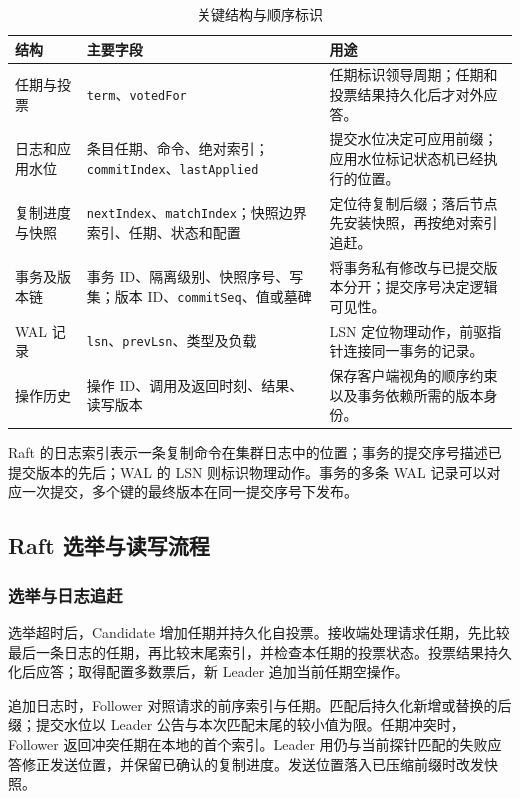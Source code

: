 \begin{table}[htbp]
\centering
\caption{关键结构与顺序标识}
\label{tab:structures}
\begin{tabularx}{\linewidth}{@{}l >{\raggedright\arraybackslash}X >{\raggedright\arraybackslash}X@{}}
\toprule
结构 & 主要字段 & 用途 \\
\midrule
任期与投票 & \texttt{term}、\texttt{votedFor} & 任期标识领导周期；任期和投票结果持久化后才对外应答。 \\
日志和应用水位 & 条目任期、命令、绝对索引；\texttt{commitIndex}、\texttt{lastApplied} & 提交水位决定可应用前缀；应用水位标记状态机已经执行的位置。 \\
复制进度与快照 & \texttt{nextIndex}、\texttt{matchIndex}；快照边界索引、任期、状态和配置 & 定位待复制后缀；落后节点先安装快照，再按绝对索引追赶。 \\
事务及版本链 & 事务 ID、隔离级别、快照序号、写集；版本 ID、\texttt{commitSeq}、值或墓碑 & 将事务私有修改与已提交版本分开；提交序号决定逻辑可见性。 \\
WAL 记录 & \texttt{lsn}、\texttt{prevLsn}、类型及负载 & LSN 定位物理动作，前驱指针连接同一事务的记录。 \\
操作历史 & 操作 ID、调用及返回时刻、结果、读写版本 & 保存客户端视角的顺序约束以及事务依赖所需的版本身份。 \\
\bottomrule
\end{tabularx}
\end{table}

Raft 的日志索引表示一条复制命令在集群日志中的位置；事务的提交序号描述已提交版本的先后；WAL 的 LSN 则标识物理动作。事务的多条 WAL 记录可以对应一次提交，多个键的最终版本在同一提交序号下发布。

\subsection{Raft 选举与读写流程}
\subsubsection{选举与日志追赶}
选举超时后，Candidate 增加任期并持久化自投票。接收端处理请求任期，先比较最后一条日志的任期，再比较末尾索引，并检查本任期的投票状态。投票结果持久化后应答；取得配置多数票后，新 Leader 追加当前任期空操作。

追加日志时，Follower 对照请求的前序索引与任期。匹配后持久化新增或替换的后缀；提交水位以 Leader 公告与本次匹配末尾的较小值为限。任期冲突时，Follower 返回冲突任期在本地的首个索引。Leader 用仍与当前探针匹配的失败应答修正发送位置，并保留已确认的复制进度。发送位置落入已压缩前缀时改发快照。

